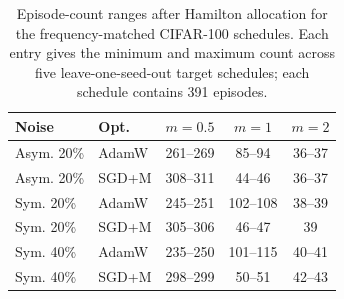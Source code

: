 \begin{table}[H]
\centering
\caption{Episode-count ranges after Hamilton allocation for the
frequency-matched CIFAR-100 schedules. Each entry gives the minimum
and maximum count across five leave-one-seed-out target schedules;
each schedule contains 391 episodes.}
\label{tab:appendix-fm-ranges}
\scriptsize
\setlength{\tabcolsep}{4.0pt}
\renewcommand{\arraystretch}{1.03}
\begin{tabular}{llccc}
\toprule
Noise & Opt. & $m=0.5$ & $m=1$ & $m=2$ \\
\midrule
Asym. 20\% & AdamW & 261--269 & 85--94 & 36--37 \\
Asym. 20\% & SGD+M & 308--311 & 44--46 & 36--37 \\
Sym. 20\% & AdamW & 245--251 & 102--108 & 38--39 \\
Sym. 20\% & SGD+M & 305--306 & 46--47 & 39 \\
Sym. 40\% & AdamW & 235--250 & 101--115 & 40--41 \\
Sym. 40\% & SGD+M & 298--299 & 50--51 & 42--43 \\
\bottomrule
\end{tabular}
\end{table}
